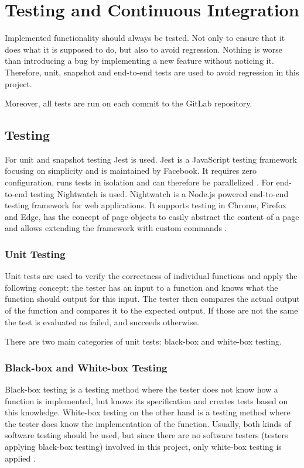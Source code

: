 \chapter{Testing and Continuous Integration}
\label{chapter:testingAndCI}

Implemented functionality should always be tested. Not only to ensure that it does what it is supposed to do, but also to avoid regression. Nothing is worse than introducing a bug by implementing a new feature without noticing it. Therefore, unit, snapshot and end-to-end tests are used to avoid regression in this project.

Moreover, all tests are run on each commit to the GitLab repository.

\section{Testing}
\label{section:testing}
For unit and snapshot testing Jest is used. Jest is a JavaScript testing framework focusing on simplicity and is maintained by Facebook. It requires zero configuration, runs tests in isolation and can therefore be parallelized \cite{Jest}. For end-to-end testing Nightwatch is used. Nightwatch is a Node.js powered end-to-end testing framework for web applications. It supports testing in Chrome, Firefox and Edge, has the concept of page objects to easily abstract the content of a page and allows extending the framework with custom commands \cite{Nightwatch}.

\subsection{Unit Testing}
\label{subsection:unitTesting}
Unit tests are used to verify the correctness of individual functions and apply the following concept: the tester has an input to a function and knows what the function should output for this input. The tester then compares the actual output of the function and compares it to the expected output. If those are not the same the test is evaluated as failed, and succeeds otherwise.

There are two main categories of unit tests: black-box and white-box testing.

\subsection*{Black-box and White-box Testing}
Black-box testing is a testing method where the tester does not know how a function is implemented, but knows its specification and creates tests based on this knowledge. White-box testing on the other hand is a testing method where the tester does know the implementation of the function. Usually, both kinds of software testing should be used, but since there are no software testers (testers applying black-box testing) involved in this project, only white-box testing is applied \cite{BlackBoxWhiteBoxTesting}.

